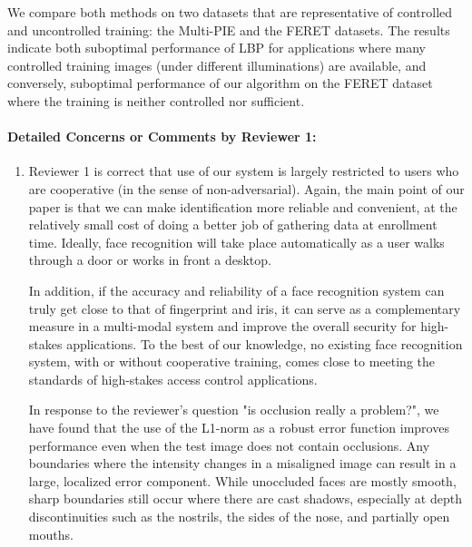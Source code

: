 \documentclass[11pt]{article}
\begin{document}
We compare both methods on two datasets that are representative of controlled and uncontrolled training: the Multi-PIE and the FERET
datasets.  The results indicate both suboptimal performance of LBP for applications where many controlled training images (under different illuminations) are available, and conversely, suboptimal performance of our algorithm on the FERET dataset where the training is neither controlled nor sufficient.

\paragraph{Detailed Concerns or Comments by Reviewer 1:} \begin{enumerate}
\item Reviewer 1 is correct that use of our system is largely restricted to
users who are cooperative (in the sense of non-adversarial). Again, the main
point of our paper is that we can make identification more reliable and
convenient, at the relatively small cost of doing a better job of gathering
data at enrollment time.  Ideally, face recognition will take place
automatically as a user walks through a door or works in front a desktop.

In addition, if the accuracy and reliability of a face recognition system can
truly get close to that of fingerprint and iris, it can serve as a
complementary measure in a multi-modal system and improve the overall security
for high-stakes applications. To the best of our knowledge, no existing face
recognition system, with or without cooperative training, comes close to meeting
the standards of high-stakes access control applications.

In response to the reviewer's question "is occlusion really a problem?", we have found that the use of
the L1-norm as a robust error function improves performance even when the test
image does not contain occlusions.  Any boundaries where the intensity changes
in a misaligned image can result in a large, localized error component.  While
unoccluded faces are mostly smooth, sharp boundaries still occur where there
are cast shadows, especially at depth discontinuities such as the nostrils, the
sides of the nose, and partially open mouths.


\end{enumerate}
\end{document}
